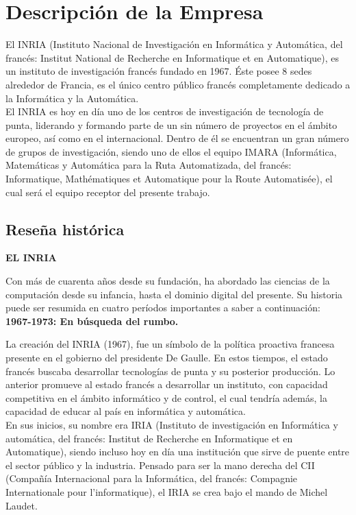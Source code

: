 \chapter{Descripción de la Empresa}
\thispagestyle{empty}

El INRIA (Instituto Nacional de Investigación en Informática y Automática, del francés: Institut National de Recherche en Informatique et en Automatique), es un instituto de investigación francés fundado en 1967. Éste posee 8 sedes alrededor de Francia, es el único centro público francés completamente dedicado a la Informática y la Automática. \\

El INRIA es hoy en día uno de los centros de investigación de tecnología de punta, liderando y formando parte de un sin número de proyectos en el ámbito europeo, así como en el internacional. Dentro de él se encuentran un gran número de grupos de investigación, siendo uno de ellos el equipo IMARA (Informática, Matemáticas y Automática para la Ruta Automatizada, del francés: Informatique, Mathématiques et Automatique pour la Route Automatisée), el cual será el equipo receptor del presente trabajo.

\section{Reseña histórica}

\noindent
\textbf{EL INRIA}

Con más de cuarenta años desde su fundación, ha abordado las ciencias de la computación desde su infancia, hasta el dominio digital del presente. Su historia puede ser resumida en cuatro períodos importantes a saber a continuación:\\

\noindent
\textbf{1967-1973: En búsqueda del rumbo.}

La creación del INRIA (1967), fue un símbolo de la política proactiva francesa presente en el gobierno del presidente De Gaulle. En estos tiempos, el estado francés buscaba desarrollar tecnologías de punta y su posterior producción. Lo anterior promueve al estado francés a desarrollar un instituto, con capacidad competitiva en el ámbito informático y de control, el cual tendría además, la capacidad de educar al país en informática y automática.\\

En sus inicios, su nombre era IRIA (Instituto de investigación en Informática y automática, del francés: Institut de Recherche en Informatique et en Automatique), siendo incluso hoy en día una institución que sirve de puente entre el sector público y la industria. Pensado para ser la mano derecha del CII (Compañía Internacional para la Informática, del francés: Compagnie Internationale pour l’informatique), el IRIA se crea bajo el mando de Michel Laudet.\\

